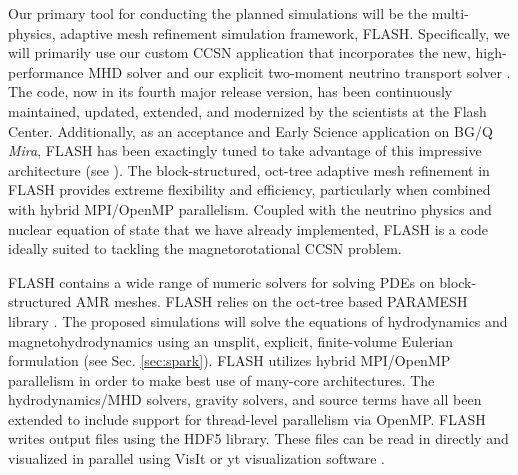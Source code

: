 Our primary tool for conducting the planned simulations will be the multi-physics, adaptive mesh refinement simulation framework, FLASH.
Specifically, we will primarily use our custom CCSN application \sparkmone that incorporates the new, high-performance \spark MHD solver \citep{Couch:2017} and our explicit two-moment neutrino transport solver \citep{OConnor:2015, OConnor:2015a}.
The code, now in its fourth major release version, has been continuously maintained, updated, extended, and modernized by the scientists at the Flash Center.
Additionally, as an acceptance and Early Science application on BG/Q {\it Mira}, FLASH has been exactingly tuned to take advantage of this impressive architecture (see \citet{Daley:2013esp}).
The block-structured, oct-tree adaptive mesh refinement in FLASH provides extreme flexibility and efficiency, particularly when combined with hybrid MPI/OpenMP parallelism.
Coupled with the neutrino physics and nuclear equation of state that we have already implemented, FLASH is a code ideally suited to tackling the magnetorotational CCSN problem.

FLASH contains a wide range of numeric solvers for solving
PDEs on block-structured AMR meshes. FLASH relies on the oct-tree
based PARAMESH library \citep{MacNeice:2000}. The proposed
simulations will solve the equations of hydrodynamics and
magnetohydrodynamics using an unsplit, explicit, finite-volume
Eulerian formulation (see Sec. \ref{sec:spark}).
FLASH utilizes hybrid MPI/OpenMP parallelism in order to make best use
of many-core architectures. The hydrodynamics/MHD
solvers, gravity solvers, and source terms have all been extended to
include support for thread-level parallelism via OpenMP.
FLASH writes output files using the HDF5 library. These files can be
read in directly and visualized in parallel using VisIt or yt
visualization software \citep{Turk:2011}.


